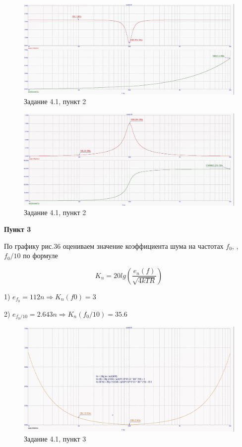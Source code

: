 \documentclass[a4paper, 14pt]{extarticle}%
\begin{document}
\begin{figure}[h!]
			\centering
			\includegraphics[width=1.1\linewidth]{4/4_1_5.jpg}
			\caption{Задание 4.1, пункт 2}
			\label{A}
\end{figure}



\begin{figure}[h!]
			\centering
			\includegraphics[width=1.1\linewidth]{4/4_1_4.jpg}
			\caption{Задание 4.1, пункт 2}
			\label{A}
\end{figure}


\textbf{Пункт 3}



По графику рис.36 оцениваем значение коэффициента шума на частотах $f_0$, \:, \: $f_0/10$ по формуле


\[  K_n = 20lg(\frac{e_n(f)}{\sqrt{4kTR}})   \]


1) $e_{f_0}= 112n \Rightarrow K_n(f0) = 3$

2) $e_{f_0/10}= 2.643n \Rightarrow K_n(f_0/10) = 35.6 $



\begin{figure}[h!]
			\centering
			\includegraphics[width=1.1\linewidth]{4/4_1_1.jpg}
			\caption{Задание 4.1, пункт 3}
			\label{A}
\end{figure}
\end{document}
